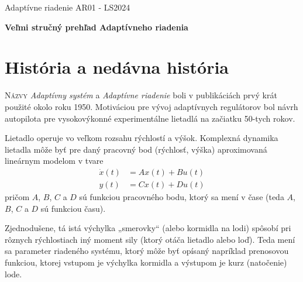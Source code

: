 \documentclass[a4paper, 10pt, ]{article}
\def\oznacenieCasti{AR01 - LS2024}
\begin{document}
\lstset{style=mystyle}




\fontsize{12pt}{22pt}\selectfont

\centerline{\textsf{Adaptívne riadenie} \hfill \textsf{\oznacenieCasti}}

\fontsize{18pt}{22pt}\selectfont






\begin{flushleft}
	\textbf{\textsf{Veľmi stručný prehľad Adaptívneho riadenia}}
\end{flushleft}





\normalsize

\bigskip

{\hypersetup{hidelinks}

\tableofcontents

}

\bigskip

\vspace{18pt}




\section{História a nedávna história}





\lettrine[lines=3, nindent=0pt]N{ázvy} \emph{Adaptívny systém} a \emph{Adaptívne riadenie} boli v publikáciách prvý krát použité okolo roku 1950. Motiváciou pre vývoj adaptívnych regulátorov bol návrh autopilota pre vysokovýkonné experimentálne lietadlá na začiatku 50-tych rokov.

Lietadlo operuje vo veľkom rozsahu rýchlostí a výšok. Komplexná dynamika lietadla môže byť pre daný pracovný bod (rýchlosť, výška) aproximovaná lineárnym modelom v tvare
\begin{subequations}
\begin{align}
	\dot{x}(t) &= A x(t) + B u(t)  \\
	y(t) &= C x(t) + D u(t)
\end{align}
\end{subequations}
pričom $A$, $B$, $C$ a $D$ sú funkciou pracovného bodu, ktorý sa mení v čase (teda $A$, $B$, $C$ a $D$ sú funkciou času).

Zjednodušene, tá istá výchylka „smerovky“ (alebo kormidla na lodi) spôsobí pri rôznych rýchlostiach iný moment sily (ktorý otáča lietadlo alebo loď). Teda mení sa parameter riadeného systému, ktorý môže byť opísaný napríklad prenosovou funkciou, ktorej vstupom je výchylka kormidla a výstupom je kurz (natočenie) lode.
\end{document}
